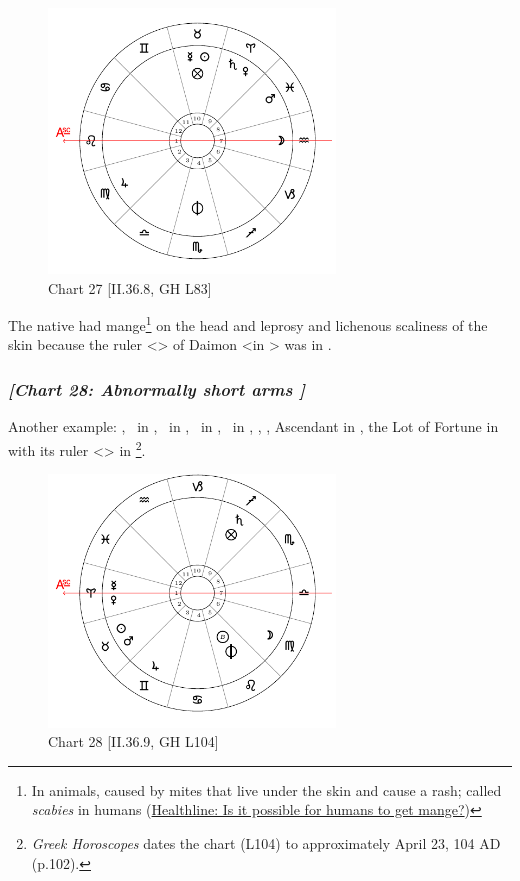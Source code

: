 \clearpage
\begin{figure}
\centering
\vspace{-20pt}
\includegraphics[width=0.68\textwidth]{charts/2_36_8}
\caption{Chart 27 [II.36.8, GH L83]}
\label{fig:chart27}
\end{figure}

The native had mange\footnote{In animals, caused by mites that live under the skin and cause a rash; called \textsl{scabies} in humans (\href{https://www.healthline.com/health/mange-in-humans}{Healthline: Is it possible for humans to get mange?})} on the head and leprosy and lichenous scaliness of the skin because the ruler <\Mars> of Daimon <in \Scorpio> was in \Pisces.

\newpage
\subsubsection{\textit{[Chart 28: Abnormally short arms ]}}
Another example: \Sun, \Mars\, in \Taurus, \Moon\, in \Virgo, \Saturn\, in \Sagittarius, \Jupiter\, in \Gemini, \Mercury, \Venus, Ascendant in \Aries, the Lot of Fortune in \Sagittarius with its ruler <\Jupiter> in \Gemini
\footnote{\textit{Greek Horoscopes} dates the chart (L104) to approximately April 23, 104 AD (p.102).}.

\clearpage
\begin{figure}
\centering
\vspace{-20pt}
\includegraphics[width=0.68\textwidth]{charts/2_36_9}
\caption{Chart 28 [II.36.9, GH L104]}
\label{fig:chart28}
\end{figure}

